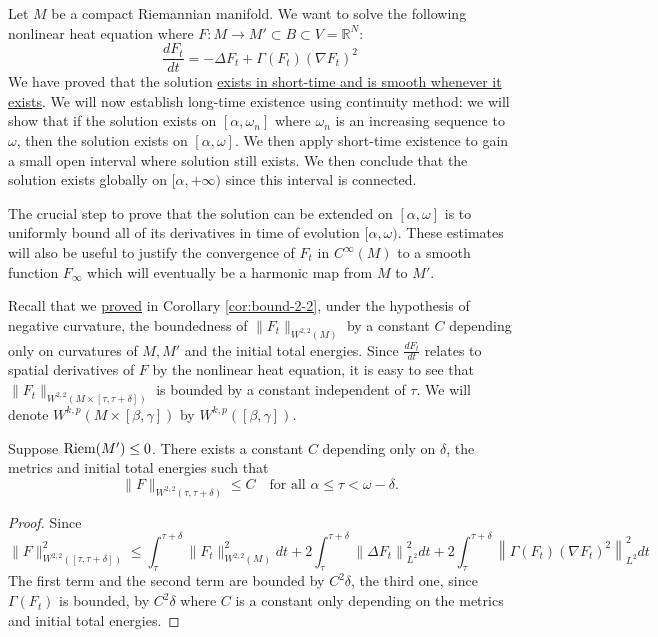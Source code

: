 \iffalse
\begin{info}
The PDF version of this page can be downloaded by replacing \texttt{html} in the its address by
\texttt{pdf}. 
For example \texttt{/html/sheaf-cohomology.html} should become \texttt{/pdf/sheaf-cohomology.pdf}.
\end{info}
\fi

Let \(M\) be a compact Riemannian manifold. We want to solve the following nonlinear
heat equation where \(F: M \longrightarrow M'\subset
B\subset V = \mathbb{R}^N\):
\[
 \frac{d F_t}{d t} = -\Delta F_t + \Gamma(F_t) (\nabla F_t)^2
\]
We have proved that the solution \href{polynomial-besov.org}{exists in short-time and is smooth whenever it exists}. We will now establish long-time existence using continuity
method: we will show that if the solution exists on \([\alpha,\omega_n]\) where
\(\omega_n\) is an increasing sequence to \(\omega\), then the solution exists on \([\alpha,\omega]\). We then apply short-time existence to gain a small open interval where
solution still exists. We then conclude that the solution exists globally on \([\alpha,+\infty)\) since this interval is connected.

The crucial step to prove that the solution can be extended on \([\alpha,\omega]\) is to
uniformly bound all of its derivatives in time of evolution \([\alpha,\omega)\). These
estimates will also be useful to justify the convergence of \(F_t\) in \(C^\infty(M)\) to a smooth function \(F_\infty\) which will eventually be a harmonic map
from \(M\) to \(M'\).

Recall that we \href{harmonic-maps.org}{proved} in Corollary \ref{cor:bound-2-2}, under the hypothesis of negative curvature, the boundedness of \(\|F_t\|_{W^{2,2}(M)}\) by a constant \(C\) depending only on curvatures of \(M, M'\) and
the initial total energies. Since \(\frac{dF_t}{dt }\) relates to spatial derivatives of
\(F\) by the nonlinear heat equation, it is easy to see that \(\|F_t\|_{W^{2,2}(M\times[\tau,\tau +\delta])}\) is bounded by a constant independent of
\(\tau\). We will denote \(W^{k,p}(M\times [\beta,\gamma])\) by \(W^{k,p}([\beta,\gamma])\).

\begin{theorem}[\(W^{2,2}\)-boundedness]
\label{thm:bound-2-2}
Suppose \(\mathop{\rm Riem}\nolimits(M') \leq 0\). There exists a constant \(C\) depending only on \(\delta\), the metrics and initial
total energies such that
\[
 \|F\|_{W^{2,2}(\tau,\tau+\delta)}\leq C\quad\text{for all } \alpha \leq \tau <\omega-\delta.
\]
\end{theorem}
\begin{proof}
Since 
\[ \|F\|^2_{W^{2,2}([\tau,\tau+\delta])} \leq \int_\tau^{\tau+\delta}
\|F_t\|^2_{W^{2,2}(M)} dt + 2\int_\tau^{\tau+\delta} \left\| \Delta F_t
\right\|^2_{L^2}dt + 2\int_\tau^{\tau+\delta} \left\| \Gamma(F_t)(\nabla F_t)^2
\right\|^2_{L^2}dt
\]
The first term and the second term are bounded by \(C^2\delta\), the third one, since \(\Gamma(F_t)\) is bounded, by \(C^2\delta\) where \(C\) is a constant only depending on
the metrics and initial total energies.
\end{proof}

